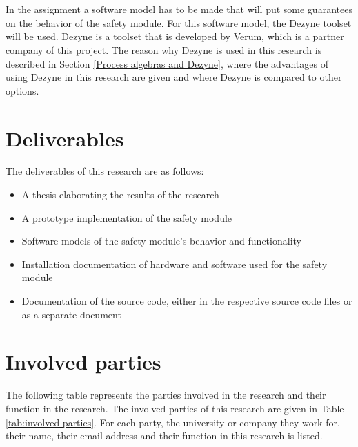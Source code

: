 \documentclass[12pt]{scrreprt}
\begin{document}
\\\\
In the assignment a software model has to be made that will put some guarantees on the behavior of the safety module. For this software model, the Dezyne toolset will be used. Dezyne is a toolset that is developed by Verum, which is a partner company of this project. The reason why Dezyne is used in this research is described in Section \ref{Process algebras and Dezyne}, where the advantages of using Dezyne in this research are given and where Dezyne is compared to other options.

\section{Deliverables}
\label{Deliverables}
The deliverables of this research are as follows:

\begin{itemize}
    \item A thesis elaborating the results of the research
    \item A prototype implementation of the safety module
    \item Software models of the safety module's behavior and functionality
    \item Installation documentation of hardware and software used for the safety module
    \item Documentation of the source code, either in the respective source code files or as a separate document
\end{itemize}

\section{Involved parties}
\label{Parties involved and communication scheme}
The following table represents the parties involved in the research and their function in the research.
The involved parties of this research are given in Table \ref{tab:involved-parties}. For each party, the university or company they work for, their name, their email address and their function in this research is listed.
\end{document}
